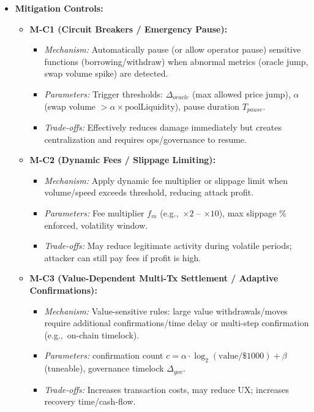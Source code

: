 \begin{itemize}
    \item \textbf{Mitigation Controls:}
    \begin{itemize}
        \item \textbf{M-C1 (Circuit Breakers / Emergency Pause):}
            \begin{itemize}
                \item \textit{Mechanism:} Automatically pause (or allow operator pause) sensitive functions (borrowing/withdraw) when abnormal metrics (oracle jump, swap volume spike) are detected.
                \item \textit{Parameters:} Trigger thresholds: $\Delta_{oracle}$ (max allowed price jump), $\alpha$ (swap volume $> \alpha \times \text{poolLiquidity}$), pause duration $T_{pause}$.
                \item \textit{Trade-offs:} Effectively reduces damage immediately but creates centralization and requires ops/governance to resume.
            \end{itemize}
        \item \textbf{M-C2 (Dynamic Fees / Slippage Limiting):}
            \begin{itemize}
                \item \textit{Mechanism:} Apply dynamic fee multiplier or slippage limit when volume/speed exceeds threshold, reducing attack profit.
                \item \textit{Parameters:} Fee multiplier $f_m$ (e.g.,\ $\times 2$ -- $\times 10$), max slippage \% enforced, volatility window.
                \item \textit{Trade-offs:} May reduce legitimate activity during volatile periods; attacker can still pay fees if profit is high.
            \end{itemize}
        \item \textbf{M-C3 (Value-Dependent Multi-Tx Settlement / Adaptive Confirmations):}
            \begin{itemize}
                \item \textit{Mechanism:} Value-sensitive rules: large value withdrawals/moves require additional confirmations/time delay or multi-step confirmation (e.g.,\ on-chain timelock).
                \item \textit{Parameters:} confirmation count $c = \alpha \cdot \log_2(\text{value}/\$1000)+\beta$ (tuneable), governance timelock $\Delta_{gov}$.
                \item \textit{Trade-offs:} Increases transaction costs, may reduce UX; increases recovery time/cash-flow.
            \end{itemize}
    \end{itemize}


\end{itemize}
